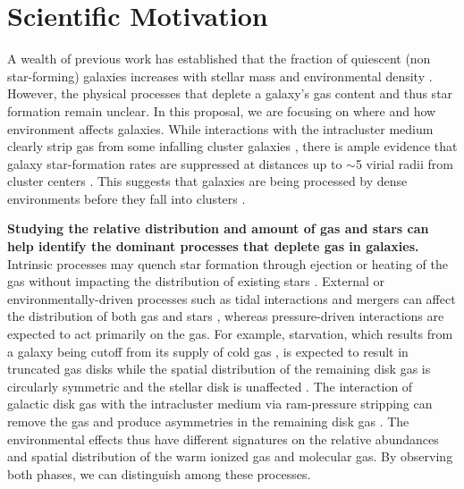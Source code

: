 \documentclass[11pt, preprint]{aastex}
\begin{document}
\vspace*{-1cm}
\section{Scientific Motivation}
\vspace*{-.4cm}

A wealth of previous work has established that the fraction of
quiescent (non star-forming) galaxies increases with
stellar mass and environmental density \citep[e.g.][]{dale01,kauffmann04,peng10}.
However, the physical processes that deplete a galaxy's gas content and
thus star formation remain unclear.  
In this proposal, we are focusing on where and how environment affects galaxies.  
While interactions with the intracluster medium clearly strip gas
from some infalling cluster galaxies \citep[e.g.][]{chung07}, there
is ample evidence that galaxy star-formation rates are suppressed at distances up
to $\sim$5 virial radii from cluster centers \citep[see Fig 1, left
panel; ][]{lewis02,gomez03, bahe13}.  
This suggests that galaxies are being processed by dense environments before they
fall into clusters \citep[e.g.][]{poggianti99,cortese06}.  

{\bf Studying the relative distribution
and amount of gas and stars can help identify the dominant processes
that deplete gas in galaxies. }
Intrinsic processes may quench star formation through
ejection or heating of the gas without impacting the distribution of
existing stars \citep[e.g.][]{springel05,
  croton06, dekel06}.  External or environmentally-driven processes 
such as tidal interactions and
mergers can
affect the distribution of both gas and stars \citep{springel05,
  croton06, dekel06}, whereas pressure-driven interactions are expected to
act primarily on the gas.  For example, starvation, which results from
a galaxy being cutoff from its supply of cold gas \citep{larson80}, is
expected to result in
truncated gas disks while the spatial distribution of the
remaining disk gas is circularly symmetric and the stellar disk is unaffected \citep[e.g.][]{kawata08}. 
The interaction of galactic disk gas with the intracluster medium via
ram-pressure stripping can remove the gas and produce asymmetries in
the remaining disk gas \citep[e.g.][]{quilis00,crowl05}.  
{The environmental effects thus
have different signatures on the relative abundances and spatial
distribution of the warm ionized gas and molecular gas.  By
observing both 
phases, we can distinguish among these processes.}
 
\end{document}
